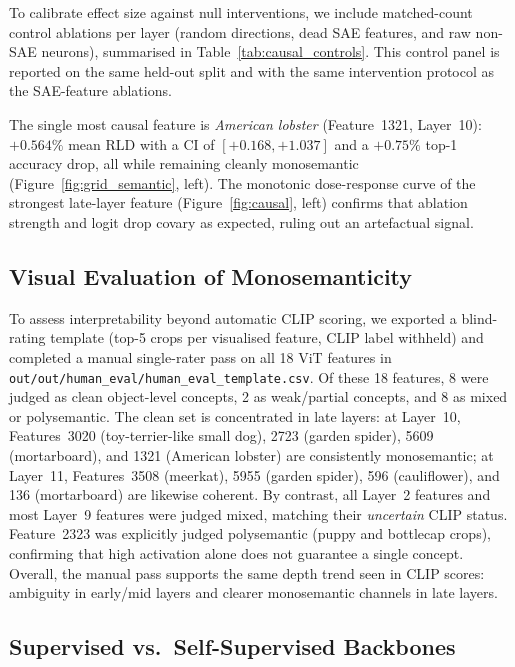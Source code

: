 To calibrate effect size against null interventions, we include matched-count control ablations per layer (random directions, dead SAE features, and raw non-SAE neurons), summarised in Table~\ref{tab:causal_controls}. This control panel is reported on the same held-out split and with the same intervention protocol as the SAE-feature ablations.

The single most causal feature is \textit{American lobster} (Feature~1321, Layer~10): $+0.564\%$ mean RLD with a CI of $[+0.168,+1.037]$ and a $+0.75\%$ top-1 accuracy drop, all while remaining cleanly monosemantic (Figure~\ref{fig:grid_semantic}, left). The monotonic dose-response curve of the strongest late-layer feature (Figure~\ref{fig:causal}, left) confirms that ablation strength and logit drop covary as expected, ruling out an artefactual signal.

\subsection{Visual Evaluation of Monosemanticity}

To assess interpretability beyond automatic CLIP scoring, we exported a blind-rating template (top-5 crops per visualised feature, CLIP label withheld) and completed a manual single-rater pass on all 18 ViT features in \texttt{out/out/human\_eval/human\_eval\_template.csv}. Of these 18 features, 8 were judged as clean object-level concepts, 2 as weak/partial concepts, and 8 as mixed or polysemantic. The clean set is concentrated in late layers: at Layer~10, Features~3020 (toy-terrier-like small dog), 2723 (garden spider), 5609 (mortarboard), and 1321 (American lobster) are consistently monosemantic; at Layer~11, Features~3508 (meerkat), 5955 (garden spider), 596 (cauliflower), and 136 (mortarboard) are likewise coherent. By contrast, all Layer~2 features and most Layer~9 features were judged mixed, matching their \emph{uncertain} CLIP status. Feature~2323 was explicitly judged polysemantic (puppy and bottlecap crops), confirming that high activation alone does not guarantee a single concept. Overall, the manual pass supports the same depth trend seen in CLIP scores: ambiguity in early/mid layers and clearer monosemantic channels in late layers.

\subsection{Supervised vs.\ Self-Supervised Backbones}

